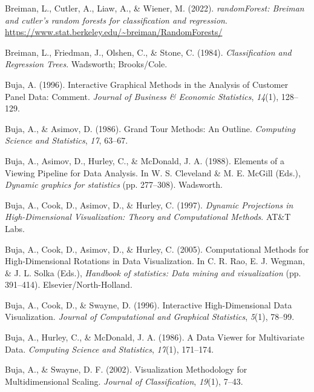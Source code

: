 \documentclass[
  letterpaper,
]{book}
\newlength{\cslhangindent}
\newlength{\cslentryspacingunit} %
\newenvironment{CSLReferences}[2] %
 {%
  \setlength{\parindent}{0pt}
  \ifodd #1
  \let\oldpar\par
  \def\par{\hangindent=\cslhangindent\oldpar}
  \fi
  \setlength{\parskip}{#2\cslentryspacingunit}
 }%
 {}
\begin{document}
\begin{CSLReferences}{1}{0}
\leavevmode{}%
Breiman, L., Cutler, A., Liaw, A., \& Wiener, M. (2022).
\emph{randomForest: Breiman and cutler's random forests for
classification and regression}.
\url{https://www.stat.berkeley.edu/~breiman/RandomForests/}

\leavevmode{}%
Breiman, L., Friedman, J., Olshen, C., \& Stone, C. (1984).
\emph{Classification and {R}egression {T}rees}. Wadsworth; Brooks/Cole.

\leavevmode{}%
Buja, A. (1996). Interactive {G}raphical {M}ethods in the {A}nalysis of
{C}ustomer {P}anel {D}ata: {C}omment. \emph{Journal of Business \&
Economic Statistics}, \emph{14}(1), 128--129.

\leavevmode{}%
Buja, A., \& Asimov, D. (1986). {G}rand {T}our {M}ethods: {A}n
{O}utline. \emph{Computing Science and Statistics}, \emph{17}, 63--67.

\leavevmode{}%
Buja, A., Asimov, D., Hurley, C., \& McDonald, J. A. (1988). {E}lements
of a {V}iewing {P}ipeline for {D}ata {A}nalysis. In W. S. Cleveland \&
M. E. McGill (Eds.), \emph{Dynamic graphics for statistics} (pp.
277--308). Wadsworth.

\leavevmode{}%
Buja, A., Cook, D., Asimov, D., \& Hurley, C. (1997). \emph{Dynamic
{P}rojections in {H}igh-{D}imensional {V}isualization: {T}heory and
{C}omputational {M}ethods}. AT\&{T} Labs.

\leavevmode{}%
Buja, A., Cook, D., Asimov, D., \& Hurley, C. (2005). {C}omputational
{M}ethods for {H}igh-{D}imensional {R}otations in {D}ata
{V}isualization. In C. R. Rao, E. J. Wegman, \& J. L. Solka (Eds.),
\emph{Handbook of statistics: Data mining and visualization} (pp.
391--414). Elsevier/North-Holland.

\leavevmode{}%
Buja, A., Cook, D., \& Swayne, D. (1996). {I}nteractive
{H}igh-{D}imensional {D}ata {V}isualization. \emph{Journal of
Computational and Graphical Statistics}, \emph{5}(1), 78--99.

\leavevmode{}%
Buja, A., Hurley, C., \& McDonald, J. A. (1986). A {D}ata {V}iewer for
{M}ultivariate {D}ata. \emph{Computing Science and Statistics},
\emph{17}(1), 171--174.

\leavevmode{}%
Buja, A., \& Swayne, D. F. (2002). Visualization {M}ethodology for
{M}ultidimensional {S}caling. \emph{Journal of Classification},
\emph{19}(1), 7--43.


\end{CSLReferences}
\end{document}
